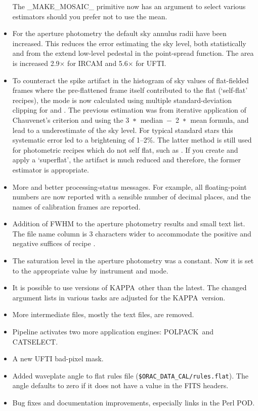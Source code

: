\documentclass[twoside,11pt,nolof]{starlink}
\providecommand{\lsk}{\raisebox{-0.4ex}{\rm *}}
\providecommand{\KAPPA}{{\footnotesize KAPPA}}
\providecommand{\POLPACK}{{\footnotesize POLPACK}}
\begin{document}
\begin{itemize}
      The \_MAKE\_MOSAIC\_ primitive now has an argument to select
      various estimators should you prefer not to use the mean.
   \item For the aperture photometry the default sky annulus radii
      have been increased.  This reduces the error estimating the sky
      level, both statistically and from the extend low-level pedestal
      in the point-spread function.  The area is increased 2.9$\times$
      for IRCAM and 5.6$\times$ for UFTI.
   \item To counteract the spike artifact in the histogram of sky values
      of flat-fielded frames where the pre-flattened frame itself
      contributed to the flat (`self-flat' recipes), the mode is
      now calculated using multiple standard-deviation clipping for
       and
      .
      The previous estimation was from iterative application of
      Chauvenet's criterion and using the \mbox{3 $\lsk$ median $-$ 2 $\lsk$ mean}
      formula, and lead to a underestimate of the sky level.  For
      typical standard stars this systematic error led to a
      brightening of 1--2\%.  The latter method is still used for
      photometric recipes which do not self flat, such as
      .
      If you create and apply a `superflat', the artifact is much
      reduced and therefore, the former estimator is appropriate.
   \item More and better processing-status messages.  For example, all
      floating-point numbers are now reported with a sensible number of
      decimal places, and the names of calibration frames are reported.
   \item Addition of FWHM to the aperture photometry results and small
      text list.  The file name column is 3 characters wider to
      accommodate the positive and negative suffices of recipe
      .
   \item The saturation level in the aperture photometry was a constant.
      Now it is set to the appropriate value by instrument and mode.
   \item It is possible to use versions of \KAPPA\  other than the
     latest.  The changed argument lists in various tasks are adjusted
     for the \KAPPA\  version.
   \item More intermediate files, mostly the text files, are removed.
   \item Pipeline activates two more application engines: \POLPACK\ and
      {\footnotesize CATSELECT}.
   \item A new UFTI bad-pixel mask.
   \item Added waveplate angle to flat rules file ({\tt\$ORAC\_DATA\_CAL/rules.flat}).
        The angle defaults to zero if it does not have a value in the FITS
        headers.
   \item Bug fixes and documentation improvements, especially links in
      the Perl POD.
\end{itemize}

\end{document}
